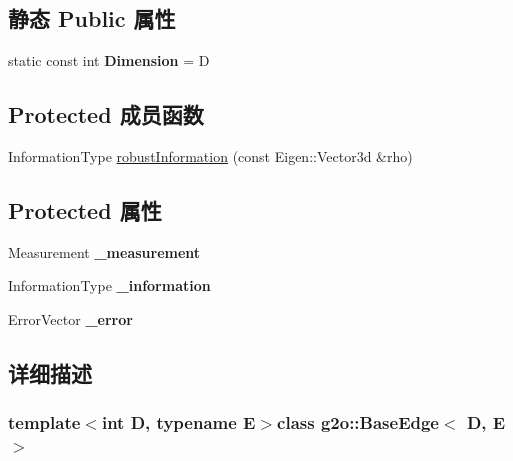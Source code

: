 \subsection*{静态 Public 属性}
\begin{DoxyCompactItemize}
\item 
\hypertarget{classg2o_1_1BaseEdge_ab4812acb21e0b9de80dc6d676e71cb70}{static const int {\bfseries Dimension} = D}\label{classg2o_1_1BaseEdge_ab4812acb21e0b9de80dc6d676e71cb70}

\end{DoxyCompactItemize}
\subsection*{Protected 成员函数}
\begin{DoxyCompactItemize}
\item 
Information\-Type \hyperlink{classg2o_1_1BaseEdge_a069937ed6fadf557368cd0fce7ab2f59}{robust\-Information} (const Eigen\-::\-Vector3d \&rho)
\end{DoxyCompactItemize}
\subsection*{Protected 属性}
\begin{DoxyCompactItemize}
\item 
\hypertarget{classg2o_1_1BaseEdge_af2a6ab1df6e91601b4cab23e0e99e034}{Measurement {\bfseries \-\_\-measurement}}\label{classg2o_1_1BaseEdge_af2a6ab1df6e91601b4cab23e0e99e034}

\item 
\hypertarget{classg2o_1_1BaseEdge_a49f11e3d1eaa8e666e1d4d3607279377}{Information\-Type {\bfseries \-\_\-information}}\label{classg2o_1_1BaseEdge_a49f11e3d1eaa8e666e1d4d3607279377}

\item 
\hypertarget{classg2o_1_1BaseEdge_af31f4b0a67bb12b4de4a32dc42467836}{Error\-Vector {\bfseries \-\_\-error}}\label{classg2o_1_1BaseEdge_af31f4b0a67bb12b4de4a32dc42467836}

\end{DoxyCompactItemize}


\subsection{详细描述}
\subsubsection*{template$<$int D, typename E$>$class g2o\-::\-Base\-Edge$<$ D, E $>$}



